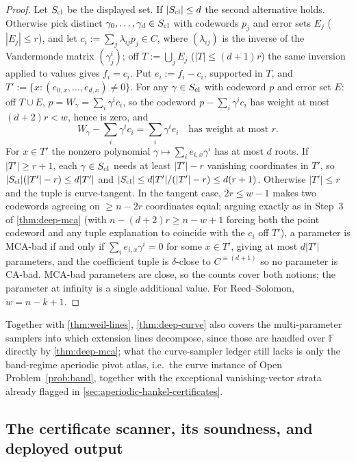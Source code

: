 \documentclass[11pt]{article}
\theoremstyle{definition}
\theoremstyle{remark}
\newcommand{\F}{\mathbb{F}}
\begin{document}
\begin{proof}
Let $S_{\rm cl}$ be the displayed set. If $|S_{\rm cl}|\le d$ the second alternative holds. Otherwise pick distinct $\gamma_0,\dots,\gamma_d\in S_{\rm cl}$ with codewords $p_j$ and error sets $E_j$ ($|E_j|\le r$), and let $c_i:=\sum_j\lambda_{ij}p_j\in C$, where $(\lambda_{ij})$ is the inverse of the Vandermonde matrix $(\gamma_j^i)$; off $T:=\bigcup_jE_j$ ($|T|\le(d+1)r$) the same inversion applied to values gives $f_i=c_i$. Put $e_i:=f_i-c_i$, supported in $T$, and $T':=\{x:(e_{0,x},\dots,e_{d,x})\ne0\}$. For any $\gamma\in S_{\rm cl}$ with codeword $p$ and error set $E$: off $T\cup E$, $p=W_\gamma=\sum_i\gamma^ic_i$, so the codeword $p-\sum_i\gamma^ic_i$ has weight at most $(d+2)r<w$, hence is zero, and
\[
W_\gamma-\sum_i\gamma^ic_i=\sum_i\gamma^ie_i
\quad\text{has weight at most }r .
\]
For $x\in T'$ the nonzero polynomial $\gamma\mapsto\sum_ie_{i,x}\gamma^i$ has at most $d$ roots. If $|T'|\ge r+1$, each $\gamma\in S_{\rm cl}$ needs at least $|T'|-r$ vanishing coordinates in $T'$, so $|S_{\rm cl}|(|T'|-r)\le d|T'|$ and $|S_{\rm cl}|\le d|T'|/(|T'|-r)\le d(r+1)$. Otherwise $|T'|\le r$ and the tuple is curve-tangent. In the tangent case, $2r\le w-1$ makes two codewords agreeing on $\ge n-2r$ coordinates equal; arguing exactly as in Step~3 of \cref{thm:deep-mca} \textup(with $n-(d+2)r\ge n-w+1$ forcing both the point codeword and any tuple explanation to coincide with the $c_i$ off $T'$\textup), a parameter is MCA-bad if and only if $\sum_ie_{i,x}\gamma^i=0$ for some $x\in T'$, giving at most $d|T'|$ parameters, and the coefficient tuple is $\delta$-close to $C^{\equiv(d+1)}$ so no parameter is CA-bad. MCA-bad parameters are close, so the counts cover both notions; the parameter at infinity is a single additional value. For Reed--Solomon, $w=n-k+1$.
\end{proof}

Together with \cref{thm:weil-lines}, \cref{thm:deep-curve} also covers the multi-parameter samplers into which extension lines decompose, since those are handled over $\F$ directly by \cref{thm:deep-mca}; what the curve-sampler ledger still lacks is only the band-regime aperiodic pivot atlas, i.e.\ the curve instance of Open Problem~\ref{prob:band}, together with the exceptional vanishing-vector strata already flagged in \cref{sec:aperiodic-hankel-certificates}.

\subsection{The certificate scanner, its soundness, and deployed output}\label{sec:discharge-T6}
\end{document}
